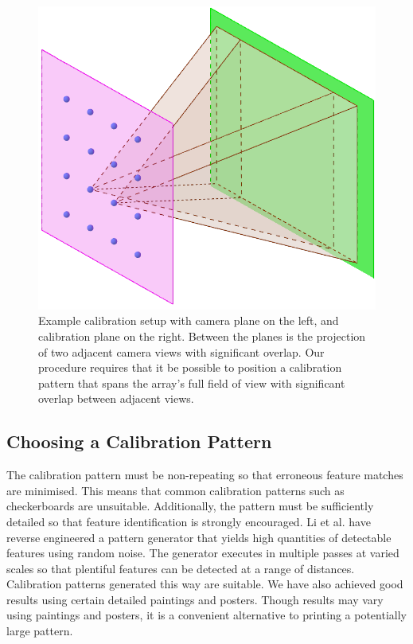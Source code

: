 \documentclass{article} \usepackage{acra}
\begin{document}
\begin{figure}[H] \centering
  \includegraphics[width=\linewidth]{images/calibration_diagram}
  \caption{Example calibration setup with camera plane on the left, and
    calibration plane on the right. Between the planes is the projection of two
    adjacent camera views with significant overlap. Our procedure requires that
    it be possible to position a calibration pattern that spans the array's full
    field of view with significant overlap between adjacent views.}
  \label{fig:calibration_diagram}
\end{figure}

\subsection{Choosing a Calibration Pattern}

The calibration pattern must be non-repeating so that erroneous feature matches
are minimised. This means that common calibration patterns such as checkerboards
are unsuitable. Additionally, the pattern must be sufficiently detailed so that
feature identification is strongly encouraged. Li et al.
 have reverse engineered a pattern generator
that yields high quantities of detectable features using random noise. The
generator executes in multiple passes at varied scales so that plentiful
features can be detected at a range of distances. Calibration patterns generated
this way are suitable. We have also achieved good results using certain detailed
paintings and posters. Though results may vary using paintings and posters, it
is a convenient alternative to printing a potentially large pattern.
\end{document}
